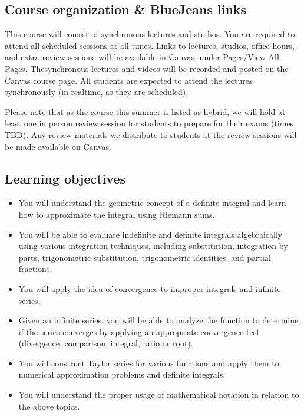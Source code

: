\documentclass[11pt]{article}
\begin{document}
\subsection{Course organization \& BlueJeans links}

This course will consist of synchronous lectures and studios. You are required to attend all scheduled sessions at all times. Links to lectures, studios, office hours, and extra review sessions will be available in Canvas, under Pages/View All Pages. Thesynchronous lectures and videos will be recorded and posted on the Canvas course page. 
All students are expected to attend the lectures synchronously (in realtime, as they are scheduled). 

Please note that as the course this summer is listed as hybrid, we will hold at least one in person review session 
for students to prepare for their exams (times TBD). Any review materials we distribute to students at the 
review sessions will be made available on Canvas. \\


\subsection{Learning objectives}

    \begin{itemize}
    \item You will understand the geometric concept of a definite integral and learn how to approximate the integral using Riemann sums.
    \item You will be able to evaluate indefinite and definite integrals algebraically using various integration techniques, including substitution, integration by parts, trigonometric substitution, trigonometric identities, and partial fractions.
    \item You will apply the idea of convergence to improper integrals and infinite series. 
    \item Given an infinite series, you will be able to analyze the function to determine if the series converges by applying an appropriate convergence test (divergence, comparison, integral, ratio or root).
    \item You will construct Taylor series for various functions and apply them to numerical approximation problems and definite integrals.
    \item You will understand the proper usage of mathematical notation in relation to the above topics.
    \end{itemize}
\end{document}
